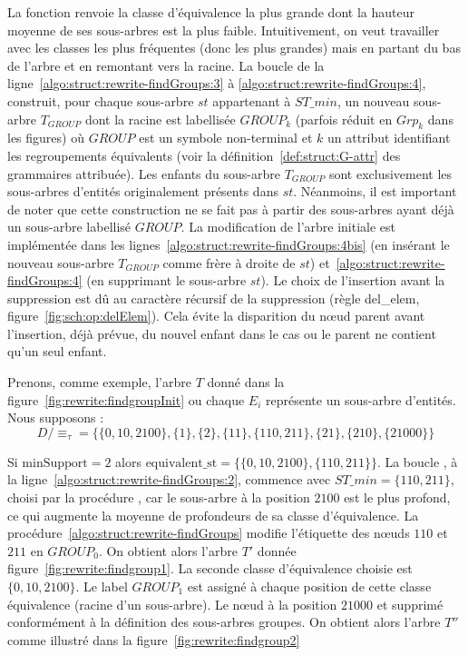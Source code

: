 La fonction \findSTwithMinLeavesTree renvoie la classe d'équivalence la plus grande dont la hauteur moyenne de ses sous-arbres est la plus faible.
Intuitivement, on veut travailler avec les classes les plus fréquentes (donc les plus grandes) mais en partant du bas de l'arbre et en remontant vers la racine.
La boucle  de la ligne~\ref{algo:struct:rewrite-findGroups:3} à \ref{algo:struct:rewrite-findGroups:4}, construit, pour chaque sous-arbre $st$ appartenant à $ST\_min $, un nouveau sous-arbre $T_{GROUP}$ dont la racine est labellisée $GROUP_k$ (parfois réduit en $Grp_k$ dans les figures) où $GROUP$ est un symbole non-terminal et $k$ un attribut identifiant les regroupements équivalents (voir la définition~\ref{def:struct:G-attr} des grammaires attribuée).
Les enfants du sous-arbre $T_{GROUP}$ sont exclusivement les sous-arbres d'entités originalement présents dans $st$.
Néanmoins, il est important de noter que cette construction ne se fait pas à partir des sous-arbres ayant déjà un sous-arbre labellisé $GROUP$.
La modification de l'arbre initiale est implémentée dans les lignes~\ref{algo:struct:rewrite-findGroups:4bis} (en insérant le nouveau sous-arbre $T_{GROUP}$ comme frère à droite de $st$) et~\ref{algo:struct:rewrite-findGroups:4} (en supprimant le sous-arbre $st$).
Le choix de l'insertion avant la suppression est dû au caractère récursif de la suppression (règle \textsf{del\_elem}, figure~\ref{fig:sch:op:delElem}).
Cela évite la disparition du nœud parent avant l'insertion, déjà prévue, du nouvel enfant dans le cas ou le parent ne contient qu'un seul enfant.

\begin{example}
    Prenons, comme exemple, l'arbre $T$ donné dans la figure~\ref{fig:rewrite:findgroupInit} ou chaque $E_i$ représente un sous-arbre d'entités.
    Nous supposons :
    \[
        D/\equiv_\tau = \{\{0, 10, 2100\}, \{1\}, \{2\}, \{11\}, \{110, 211\} , \{21\} , \{210\} , \{21000\} \}
    \]

    Si $\text{minSupport} = 2$ alors $\text{equivalent\_st} = \{\{0, 10, 2100\}, \{110, 211\}\}$.
    La boucle , à la ligne~\ref{algo:struct:rewrite-findGroups:2}, commence avec $ST\_min = \{110, 211\}$, choisi par la procédure \findSTwithMinLeavesTree, car le sous-arbre à la position $2100$ est le plus profond, ce qui augmente la moyenne de profondeurs de sa classe d'équivalence.
    La procédure~\ref{algo:struct:rewrite-findGroups} modifie l'étiquette des nœuds $110$ et $211$ en $GROUP_0$.
    On obtient alors l'arbre $T'$ donnée figure~\ref{fig:rewrite:findgroup1}.
    La seconde classe d'équivalence choisie est $\{0, 10, 2100\}$.
    Le label $GROUP_1$ est assigné à chaque position de cette classe équivalence (racine d'un sous-arbre).
    Le nœud à la position $21000$ et supprimé conformément à la définition des sous-arbres groupes.
    On obtient alors l'arbre $T''$ comme illustré dans la figure~\ref{fig:rewrite:findgroup2}
\end{example}

